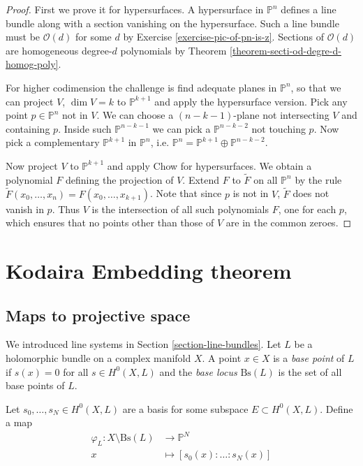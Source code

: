 \begin{proof}
First we prove it for hypersurfaces.
A hypersurface in $\mathbb{P}^n$ defines a
line bundle
along with a section vanishing on the
hypersurface.
Such a line bundle must be $\mathcal{O}(d)$
for some $d$
by Exercise \ref{exercise-pic-of-pn-is-z}.
Sections of $\mathcal{O}(d)$ are homogeneous
degree-$d$ polynomials
by Theorem
\ref{theorem-secti-od-degre-d-homog-poly}.

For higher codimension the challenge is find
adequate planes
in $\mathbb{P}^n$, so that we can project
$V$, $\dim V=k$
to $\mathbb{P}^{k+1}$ and apply the
hypersurface version.
Pick any point $p\in \mathbb{P}^n$ not in
$V$.
We can choose a $(n-k-1)$-plane not
intersecting $V$ and containing $p$.
Inside such $\mathbb{P}^{n-k-1}$ we can pick
a $\mathbb{P}^{n-k-2}$
not touching $p$.
Now pick a complementary $\mathbb{P}^{k+1}$
in $\mathbb{P}^n$,
i.e. $\mathbb{P}^n=\mathbb{P}^{k+1}\oplus
\mathbb{P}^{n-k-2}$.

Now project $V$ to $\mathbb{P}^{k+1}$ and
apply Chow for hypersurfaces.
We obtain a polynomial $F$ defining the
projection of $V$.
Extend $F$ to $\tilde{F}$ on all
$\mathbb{P}^n$ by the rule
$\tilde{F}(x_0,…,x_n)=F(x_0,…,x_{k+1})$.
Note that since $p$ is not in $V$,
$\tilde{F}$ does not vanish in $p$.
Thus $V$ is the intersection of all such
polynomials $F$,
one for each $p$, which ensures that no
points other than those
of $V$ are in the common zeroes.
\end{proof}

\section{Kodaira Embedding theorem}
\label{section-kodaira-embedding}

\subsection{Maps to projective space}
\label{subsection-maps-to-projective-space}

\noindent
We introduced line systems in Section
\ref{section-line-bundles}.
Let $L$ be a holomorphic bundle on a complex
manifold $X$.
A point $x \in X$ is
a {\it base point} of $L$ if $s(x)=0$ for all
$s\in H^{0}(X,L)$
and the {\it base locus} $\text{Bs}(L)$
is the set of all base points of $L$.

Let $s_0,\ldots,s_N\in H^{0}(X,L)$ are a
basis
for some subspace $E \subset H^0(X,L)$.
Define a map
$$
\begin{aligned}
\varphi_L: X\setminus\text{Bs}(L)
&\longrightarrow \mathbb{P}^N \\
x &\longmapsto [s_0(x):\ldots:s_N(x)]
\end{aligned}
$$

